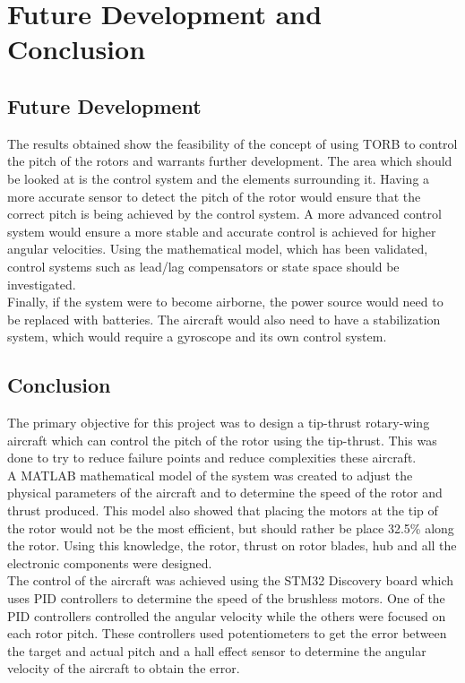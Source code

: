 \chapter{Future Development and Conclusion}
\label{sec: conclusion}
\section{Future Development}
    The results obtained show the feasibility of the concept of using TORB to control the pitch of the rotors and warrants further development. The area which should be looked at is the control system and the elements surrounding it. Having a more accurate sensor to detect the pitch of the rotor would ensure that the correct pitch is being achieved by the control system. A more advanced control system would ensure a more stable and accurate control is achieved for higher angular velocities. Using the mathematical model, which has been validated, control systems such as lead/lag compensators or state space should be investigated.\\
    Finally, if the system were to become airborne, the power source would need to be replaced with batteries. The aircraft would also need to have a stabilization system, which would require a gyroscope and its own control system.

\section{Conclusion}
    The primary objective for this project was to design a tip-thrust rotary-wing aircraft which can control the pitch of the rotor using the tip-thrust. This was done to try to reduce failure points and reduce complexities these aircraft.\\

    A MATLAB mathematical model of the system was created to adjust the physical parameters of the aircraft and to determine the speed of the rotor and thrust produced. This model also showed that placing the motors at the tip of the rotor would not be the most efficient, but should rather be place 32.5\% along the rotor. Using this knowledge, the rotor, thrust on rotor blades, hub and all the electronic components were designed.\\

    The control of the aircraft was achieved using the STM32 Discovery board which uses PID controllers to determine the speed of the brushless motors. One of the PID controllers controlled the angular velocity while the others were focused on each rotor pitch. These controllers used potentiometers to get the error between the target and actual pitch and a hall effect sensor to determine the angular velocity of the aircraft to obtain the error. \\

